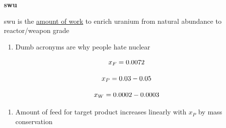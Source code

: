 \documentclass[aspectratio=1610,pdftex,dvipsnames,compress,xcolor={dvipsnames}]{beamer}
\newcommand{\acf}{\acrfull} %
\newcommand{\acs}{\acrshort} %
\begin{document}
\begin{frame}[plain]{}
    \centering\LARGE\textbf{\acf{swu}}
\end{frame}


\addtocounter{framenumber}{-1} 
\begin{frame}{\acs{swu} is the \href{https://uidaho.pressbooks.pub/nuclearengineering/chapter/swu/}{amount of work} to enrich uranium from natural abundance to reactor/weapon grade}
    \begin{enumerate}[series=outerlist,topsep=0pt,itemsep=21pt,leftmargin=*,label=(\arabic*)]
        \item[]Dumb acronyms are why people hate nuclear
    \end{enumerate}

    \vspace*{\fill}

    \begin{equation}
        \LARGE
        x_F = 0.0072
    \end{equation}

    \begin{equation}
        \LARGE 
        x_P = 0.03 - 0.05
    \end{equation}

    \begin{equation}
        \LARGE 
        x_W = 0.0002 - 0.0003
    \end{equation}
    
    \vspace*{\fill}

    \begin{enumerate}[series=outerlist,topsep=0pt,itemsep=21pt,leftmargin=*,label=(\arabic*)]
        \item[]Amount of feed for target product increases linearly with $x_P$ by mass conservation
    \end{enumerate}
\end{frame}
\end{document}
